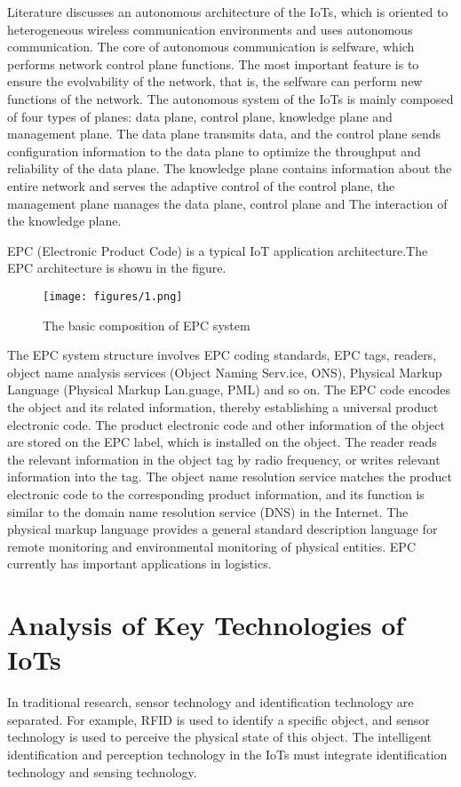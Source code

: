 \documentclass[a4paper,11pt]{article}
\begin{document}
Literature\cite{5} discusses an autonomous architecture of the IoTs, which is oriented to heterogeneous wireless communication environments and uses autonomous communication. The core of autonomous communication is selfware, which performs network control plane functions. The most important feature is to ensure the evolvability of the network, that is, the selfware can perform new functions of the network. The autonomous system of the IoTs is mainly composed of four types of planes: data plane, control plane, knowledge plane and management plane. The data plane transmits data, and the control plane sends configuration information to the data plane to optimize the throughput and reliability of the data plane. The knowledge plane contains information about the entire network and serves the adaptive control of the control plane, the management plane manages the data plane, control plane and The interaction of the knowledge plane.

EPC (Electronic Product Code) is a typical IoT application architecture.The EPC architecture is shown in the figure.
\begin{figure}[H]
\centering
\texttt{[image: figures/1.png]}
\caption{The basic composition of EPC system}
\end{figure}
The EPC system structure involves EPC coding standards, EPC tags, readers, object name analysis services (Object Naming Serv.ice, ONS), Physical Markup Language (Physical Markup Lan.guage, PML) and so on. The EPC code encodes the object and its related information, thereby establishing a universal product electronic code. The product electronic code and other information of the object are stored on the EPC label, which is installed on the object. The reader reads the relevant information in the object tag by radio frequency, or writes relevant information into the tag. The object name resolution service matches the product electronic code to the corresponding product information, and its function is similar to the domain name resolution service (DNS) in the Internet. The physical markup language provides a general standard description language for remote monitoring and environmental monitoring of physical entities. EPC currently has important applications in logistics.
\section{Analysis of Key Technologies of IoTs}
In traditional research, sensor technology and identification technology are separated. For example, RFID is used to identify a specific object, and sensor technology is used to perceive the physical state of this object. The intelligent identification and perception technology in the IoTs must integrate identification technology and sensing technology.
\end{document}
